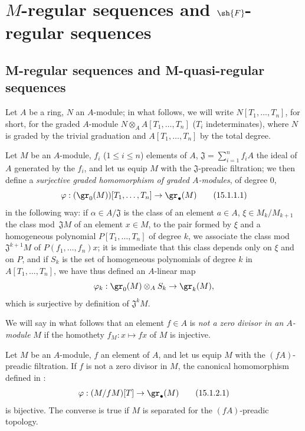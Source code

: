 \section{\texorpdfstring{$M$}{M}-regular sequences and \texorpdfstring{$\sh{F}$}{F}-regular sequences}
\label{section:0.15}

\subsection{M-regular sequences and M-quasi-regular sequences}
\label{subsection:0.15.1}
\label{0.15.1}

\begin{env}[15.1.1]
\label{0.15.1.1}
Let $A$ be a ring, $N$ an $A$-module;
in what follows, we will write $N[T_1,\ldots,T_n]$, for short, for the graded $A$-module $N\otimes_A A[T_1,\ldots,T_n]$ ($T_i$ indeterminates), where $N$ is graded by the trivial graduation and $A[T_1,\ldots,T_n]$ by the total degree.

Let $M$ be an $A$-module, $f_i$ ($1\leq i\leq n$) elements of $A$, $\mathfrak{J}=\sum_{i=1}^n f_iA$ the ideal of $A$ generated by the $f_i$, and let us equip $M$ with the $\mathfrak{J}$-preadic filtration;
we then define a \emph{surjective graded homomorphism of graded $A$-modules}, of degree $0$,
\[
\label{0.15.1.1.1}
  \varphi : (\gr_0(M))[T_1,\ldots,T_n] \to \gr_\bullet(M)
\tag{15.1.1.1}
\]
in the following way:
if $\alpha\in A/\mathfrak{J}$ is the class of an element $a\in A$, $\xi\in M_k/M_{k+1}$ the class mod~$\mathfrak{J}M$ of an element $x\in M$, to the pair formed by $\xi$ and a homogeneous polynomial $P[T_1,\ldots,T_n]$ of degree $k$, we associate the class mod~$\mathfrak{J}^{k+1}M$ of $P(f_1,\ldots,f_n)x$;
it is immediate that this class depends only on $\xi$ and on $P$, and if $S_k$ is the set of homogeneous polynomials of degree $k$ in $A[T_1,\ldots,T_n]$, we have thus defined an $A$-linear map
\[
  \varphi_k : \gr_0(M)\otimes_A S_k \to \gr_k(M),
\]
which is surjective by definition of $\mathfrak{J}^k M$.

We will say in what follows that an element $f\in A$ is \emph{not a zero divisor in an $A$-module} $M$ if the homothety $f_M:x\mapsto fx$ of $M$ is injective.
\end{env}

\begin{lemma}[15.1.2]
\label{0.15.1.2}
Let $M$ be an $A$-module, $f$ an element of $A$, and let us equip $M$ with the $(fA)$-preadic filtration.
If $f$ is not a zero divisor in $M$, the canonical homomorphism defined in :
\[
\label{0.15.1.2.1}
  \varphi : (M/fM)[T] \to \gr_\bullet(M)
\tag{15.1.2.1}
\]
is bijective.
The converse is true if $M$ is separated for the $(fA)$-preadic topology.
\end{lemma}

